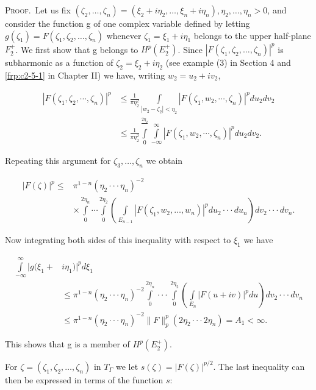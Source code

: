 \textsc{Proof.}\ Let us fix $(\zeta_2, \ldots, \zeta_n) = (\xi_2 + i\eta_2, \ldots, \xi_n + i\eta_n), \eta_2, \ldots, \eta_n > 0$, and consider the function g of one complex variable defined by letting $g(\zeta_1) = F(\zeta_1, \zeta_2, \ldots, \zeta_n)$ whenever $\zeta_1 = \xi_1 + i\eta_1$ belongs to the upper half-plane $F_2^+$. We first show that g belongs to $H^p(E_2^+)$. Since $|F(\zeta_1, \zeta_2, \ldots, \zeta_n)|^p$ is subharmonic as a function of $\zeta_2 = \xi_2 + i\eta_2$ (see example (3) in Section 4 and \eqref{frp:c2-5-1} in Chapter II) we have, writing $w_2 = u_2 + iv_2$,

\[
\begin{aligned}|F(\zeta_{1},\zeta_{2},\cdots,\zeta_{n})|^{p}&\leq\frac{1}{\pi\eta_{2}^{2}}\int\limits_{|w_{2}-\zeta_{2}|<\eta_{2}}|F(\zeta_{1},w_{2},\cdots,\zeta_{n})|^{p}du_{2}dv_{2}\\&\leq\frac{1}{\pi\eta_{2}^{2}}\int\limits_{0}^{\frac{2\eta_{2}}{}}\int\limits_{-\infty}^{\infty}|F(\zeta_{1},w_{2},\cdots,\zeta_{n})|^{p}du_{2}dv_{2}.\end{aligned}
\]

Repeating this argument for $\zeta_{3}, \ldots, \zeta_{n}$ we obtain

\[
\begin{aligned}|F(\zeta)|^{p}\leq&\pi^{1-n}(\eta_{2}\cdot\cdot\cdot\eta_{n})^{-2}\\&\times\int\limits_{0}^{2\eta_{n}}\cdots\int\limits_{0}^{2\eta_{2}}\left(\int\limits_{E_{n-1}}|F(\zeta_{1},w_{2},\ldots,w_{n})|^{p} du_{2}\cdot\cdot\cdot du_{n}\right)dv_{2}\cdot\cdot\cdot dv_{n}.\end{aligned}
\]

Now integrating both sides of this inequality with respect to $\xi_{1}$ we have

\[
\begin{aligned}\int\limits_{-\infty}^{\infty}|g(\xi_{1}+&i\eta_{1})|^{p}d\xi_{1}\\&\leq\pi^{1-n}(\eta_{2}\cdot\cdot\cdot\eta_{n})^{-2}\int\limits_{0}^{2\eta_{n}}\cdot\cdot\cdot\int\limits_{0}^{2\eta_{2}}\left(\int\limits_{E_{n}}|F(u+iv)|^{p}du\right)dv_{2}\cdot\cdot\cdot dv_{n}\\&\leq\pi^{1-n}(\eta_{2}\cdot\cdot\cdot\eta_{n})^{-2}\|F\|_{p}^{p}(2\eta_{2}\cdot\cdot\cdot2\eta_{n})=A_{1}<\infty.\end{aligned}
\]

This shows that g is a member of $H^{p}(E_{2}^{+})$.

For $\zeta = (\zeta_1, \zeta_2, \ldots, \zeta_n)$ in $T_\Gamma$ we let $s(\zeta) = |F(\zeta)|^{p/2}$. The last inequality can then be expressed in terms of the function $s$:

